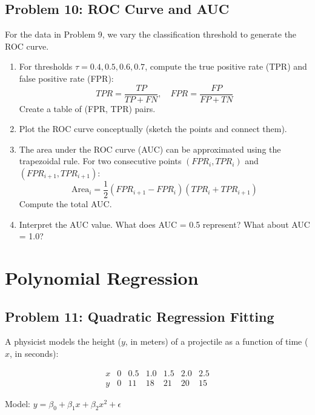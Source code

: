 \documentclass[12pt]{article}
\begin{document}
\subsection*{Problem 10: ROC Curve and AUC}

For the data in Problem 9, we vary the classification threshold to generate the ROC curve.

\begin{enumerate}[label=(\alph*)]
\item For thresholds \(\tau = 0.4, 0.5, 0.6, 0.7\), compute the true positive rate (TPR) and false positive rate (FPR):
\[
TPR = \frac{TP}{TP + FN}, \quad FPR = \frac{FP}{FP + TN}
\]
Create a table of (FPR, TPR) pairs.

\item Plot the ROC curve conceptually (sketch the points and connect them).

\item The area under the ROC curve (AUC) can be approximated using the trapezoidal rule. For two consecutive points \((FPR_i, TPR_i)\) and \((FPR_{i+1}, TPR_{i+1})\):
\[
\text{Area}_i = \frac{1}{2}(FPR_{i+1} - FPR_i)(TPR_i + TPR_{i+1})
\]
Compute the total AUC.

\item Interpret the AUC value. What does AUC = 0.5 represent? What about AUC = 1.0?
\end{enumerate}


\section{Polynomial Regression}

\subsection*{Problem 11: Quadratic Regression Fitting}

A physicist models the height (\(y\), in meters) of a projectile as a function of time (\(x\), in seconds):

\[
\begin{array}{c|cccccc}
x & 0 & 0.5 & 1.0 & 1.5 & 2.0 & 2.5 \\
\hline
y & 0 & 11 & 18 & 21 & 20 & 15
\end{array}
\]

Model: \(y = \beta_0 + \beta_1 x + \beta_2 x^2 + \epsilon\)
\end{document}
